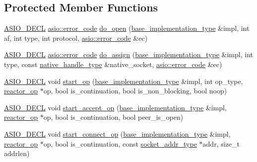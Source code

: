 \subsection*{Protected Member Functions}
\begin{DoxyCompactItemize}
\item 
\hyperlink{config_8hpp_ab54d01ea04afeb9a8b39cfac467656b7}{A\+S\+I\+O\+\_\+\+D\+E\+C\+L} \hyperlink{classasio_1_1error__code}{asio\+::error\+\_\+code} \hyperlink{classasio_1_1detail_1_1reactive__socket__service__base_a1ff70806e1ef6846c394883a65082bd0}{do\+\_\+open} (\hyperlink{structasio_1_1detail_1_1reactive__socket__service__base_1_1base__implementation__type}{base\+\_\+implementation\+\_\+type} \&impl, int af, int type, int protocol, \hyperlink{classasio_1_1error__code}{asio\+::error\+\_\+code} \&ec)
\item 
\hyperlink{config_8hpp_ab54d01ea04afeb9a8b39cfac467656b7}{A\+S\+I\+O\+\_\+\+D\+E\+C\+L} \hyperlink{classasio_1_1error__code}{asio\+::error\+\_\+code} \hyperlink{classasio_1_1detail_1_1reactive__socket__service__base_a9e8bda510627062509d64814bd2af53b}{do\+\_\+assign} (\hyperlink{structasio_1_1detail_1_1reactive__socket__service__base_1_1base__implementation__type}{base\+\_\+implementation\+\_\+type} \&impl, int type, const \hyperlink{classasio_1_1detail_1_1reactive__socket__service__base_a7838f400a17a0a3e0fd1c78040f4da53}{native\+\_\+handle\+\_\+type} \&native\+\_\+socket, \hyperlink{classasio_1_1error__code}{asio\+::error\+\_\+code} \&ec)
\item 
\hyperlink{config_8hpp_ab54d01ea04afeb9a8b39cfac467656b7}{A\+S\+I\+O\+\_\+\+D\+E\+C\+L} void \hyperlink{classasio_1_1detail_1_1reactive__socket__service__base_a72db6e5cd07a17aed3d352f7c4852436}{start\+\_\+op} (\hyperlink{structasio_1_1detail_1_1reactive__socket__service__base_1_1base__implementation__type}{base\+\_\+implementation\+\_\+type} \&impl, int op\+\_\+type, \hyperlink{classasio_1_1detail_1_1reactor__op}{reactor\+\_\+op} $\ast$op, bool is\+\_\+continuation, bool is\+\_\+non\+\_\+blocking, bool noop)
\item 
\hyperlink{config_8hpp_ab54d01ea04afeb9a8b39cfac467656b7}{A\+S\+I\+O\+\_\+\+D\+E\+C\+L} void \hyperlink{classasio_1_1detail_1_1reactive__socket__service__base_a6b9a76ac02e06ecc5dc2ec312e714191}{start\+\_\+accept\+\_\+op} (\hyperlink{structasio_1_1detail_1_1reactive__socket__service__base_1_1base__implementation__type}{base\+\_\+implementation\+\_\+type} \&impl, \hyperlink{classasio_1_1detail_1_1reactor__op}{reactor\+\_\+op} $\ast$op, bool is\+\_\+continuation, bool peer\+\_\+is\+\_\+open)
\item 
\hyperlink{config_8hpp_ab54d01ea04afeb9a8b39cfac467656b7}{A\+S\+I\+O\+\_\+\+D\+E\+C\+L} void \hyperlink{classasio_1_1detail_1_1reactive__socket__service__base_ae9fb4b74b8eca9392bc23fcd2df7f901}{start\+\_\+connect\+\_\+op} (\hyperlink{structasio_1_1detail_1_1reactive__socket__service__base_1_1base__implementation__type}{base\+\_\+implementation\+\_\+type} \&impl, \hyperlink{classasio_1_1detail_1_1reactor__op}{reactor\+\_\+op} $\ast$op, bool is\+\_\+continuation, const \hyperlink{namespaceasio_1_1detail_a40a7b0385a38f87815ffbb8df5e34d05}{socket\+\_\+addr\+\_\+type} $\ast$addr, size\+\_\+t addrlen)
\end{DoxyCompactItemize}
